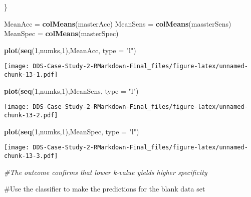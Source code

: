 \documentclass[]{article}
\newenvironment{Shaded}{\begin{snugshade}}{\end{snugshade}}
\newcommand{\CommentTok}[1]{\textcolor[rgb]{0.56,0.35,0.01}{\textit{#1}}}
\newcommand{\DataTypeTok}[1]{\textcolor[rgb]{0.13,0.29,0.53}{#1}}
\newcommand{\DecValTok}[1]{\textcolor[rgb]{0.00,0.00,0.81}{#1}}
\newcommand{\KeywordTok}[1]{\textcolor[rgb]{0.13,0.29,0.53}{\textbf{#1}}}
\newcommand{\NormalTok}[1]{#1}
\newcommand{\StringTok}[1]{\textcolor[rgb]{0.31,0.60,0.02}{#1}}
\begin{document}
\begin{Shaded}
\begin{Highlighting}[]
\NormalTok{\}}

\NormalTok{MeanAcc =}\StringTok{ }\KeywordTok{colMeans}\NormalTok{(masterAcc)}
\NormalTok{MeanSens =}\StringTok{ }\KeywordTok{colMeans}\NormalTok{(massterSens)}
\NormalTok{MeanSpec =}\StringTok{ }\KeywordTok{colMeans}\NormalTok{(masterSpec)}

\KeywordTok{plot}\NormalTok{(}\KeywordTok{seq}\NormalTok{(}\DecValTok{1}\NormalTok{,numks,}\DecValTok{1}\NormalTok{),MeanAcc, }\DataTypeTok{type =} \StringTok{"l"}\NormalTok{)}
\end{Highlighting}
\end{Shaded}

\texttt{[image: DDS-Case-Study-2-RMarkdown-Final\_files/figure-latex/unnamed-chunk-13-1.pdf]}

\begin{Shaded}
\begin{Highlighting}[]
\KeywordTok{plot}\NormalTok{(}\KeywordTok{seq}\NormalTok{(}\DecValTok{1}\NormalTok{,numks,}\DecValTok{1}\NormalTok{),MeanSens, }\DataTypeTok{type =} \StringTok{"l"}\NormalTok{)}
\end{Highlighting}
\end{Shaded}

\texttt{[image: DDS-Case-Study-2-RMarkdown-Final\_files/figure-latex/unnamed-chunk-13-2.pdf]}

\begin{Shaded}
\begin{Highlighting}[]
\KeywordTok{plot}\NormalTok{(}\KeywordTok{seq}\NormalTok{(}\DecValTok{1}\NormalTok{,numks,}\DecValTok{1}\NormalTok{),MeanSpec, }\DataTypeTok{type =} \StringTok{"l"}\NormalTok{)}
\end{Highlighting}
\end{Shaded}

\texttt{[image: DDS-Case-Study-2-RMarkdown-Final\_files/figure-latex/unnamed-chunk-13-3.pdf]}

\begin{Shaded}
\begin{Highlighting}[]
\CommentTok{#The outcome confirms that lower k-value yields higher specificity }
\end{Highlighting}
\end{Shaded}

\#Use the classifier to make the predictions for the blank data set
\end{document}
